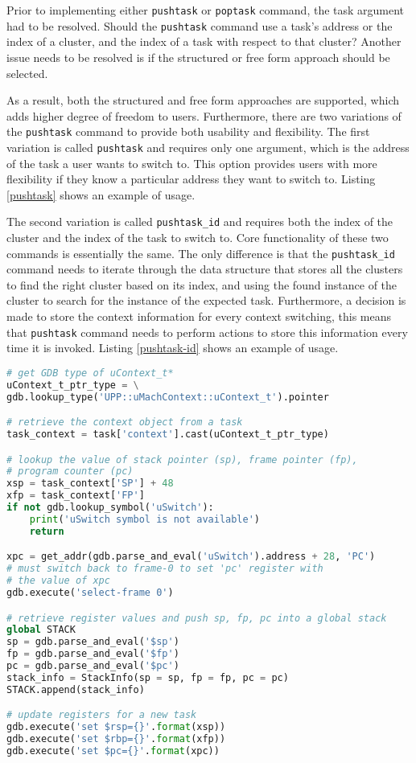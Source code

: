 Prior to implementing either \verb|pushtask| or \verb|poptask| command, the
task argument had to be resolved. Should the \verb|pushtask| command use a task's address or the index of a cluster, and the index of a task with respect
to that cluster? Another issue needs to be resolved is if the structured or free
form approach should be selected.

As a result, both the structured and free form approaches are supported, which
adds higher degree of freedom to users. Furthermore, there are two variations of the \verb|pushtask| command to provide both usability and flexibility. The first variation is called \verb|pushtask| and requires
only one argument, which is the address of the task a user wants to switch to.
This option provides users with more flexibility if they know a
particular address they want to switch to. Listing \ref{pushtask} shows an example
of usage.

The second variation is called \verb|pushtask_id| and requires both the index of
the cluster and the index of the task to switch to. Core functionality of these two commands is
essentially the same. The only difference is that the \verb|pushtask_id| command
needs to iterate through the data structure that stores all the clusters to find
the right cluster based on its index, and using the found instance of the
cluster to search for the instance of the expected task. Furthermore, a decision
is made to store the context information for every context switching, this means
that \verb|pushtask| command needs to perform actions to store this information every time it is
invoked. Listing \ref{pushtask-id} shows an example of usage.

\begin{lstlisting}[language=Python, caption={Abridged \text{push\_task} source
code},
label={pushtask-code}]
# get GDB type of uContext_t*
uContext_t_ptr_type = \
gdb.lookup_type('UPP::uMachContext::uContext_t').pointer

# retrieve the context object from a task
task_context = task['context'].cast(uContext_t_ptr_type)

# lookup the value of stack pointer (sp), frame pointer (fp),
# program counter (pc)
xsp = task_context['SP'] + 48
xfp = task_context['FP']
if not gdb.lookup_symbol('uSwitch'):
    print('uSwitch symbol is not available')
    return

xpc = get_addr(gdb.parse_and_eval('uSwitch').address + 28, 'PC')
# must switch back to frame-0 to set 'pc' register with
# the value of xpc
gdb.execute('select-frame 0')

# retrieve register values and push sp, fp, pc into a global stack
global STACK
sp = gdb.parse_and_eval('$sp')
fp = gdb.parse_and_eval('$fp')
pc = gdb.parse_and_eval('$pc')
stack_info = StackInfo(sp = sp, fp = fp, pc = pc)
STACK.append(stack_info)

# update registers for a new task
gdb.execute('set $rsp={}'.format(xsp))
gdb.execute('set $rbp={}'.format(xfp))
gdb.execute('set $pc={}'.format(xpc))
\end{lstlisting}

